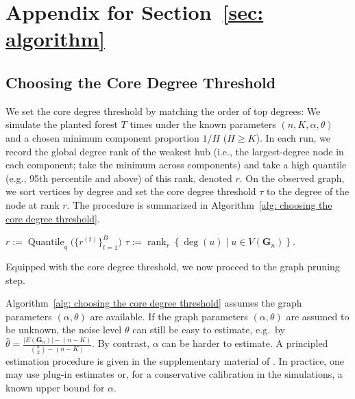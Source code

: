 \documentclass[twoside,11pt]{article}
\theoremstyle{remark}
\begin{document}
\newpage
\section{Appendix for Section~\ref{sec: algorithm}}

\subsection{Choosing the Core Degree Threshold}
\label{secsec: Choosing the Core Degree Threshold}
We set the core degree threshold by matching the order of top degrees: 
We simulate the planted forest $T$ times under the known parameters $(n, K,\alpha,\theta)$ and a chosen minimum component proportion $1/H$ ($H\ge K$).
In each run, we record the global degree rank of the weakest hub (i.e., the largest-degree node in each component; take the minimum across components) and take a high quantile (e.g., 95th percentile and above) of this rank, denoted $r$. 
On the observed graph, we sort vertices by degree and set the core degree threshold $\tau$ to the degree of the node at rank $r$.
The procedure is summarized in Algorithm~\ref{alg: choosing the core degree threshold}.

\begin{algorithm}[tbp]

\caption{Rank-based selection of core degree threshold $\tau$}
\label{alg: choosing the core degree threshold}
$r:= \operatorname{Quantile}_{q}\big(\{r^{(t)}\}_{t=1}^{B}\big)$\;
\Return $\tau:=\operatorname{rank}_{r}\left\{\operatorname{deg}\left(u\right)\mid u \in V\left(\bm{G}_n\right)\right\}$.

\end{algorithm}

Equipped with the core degree threshold, we now proceed to the graph pruning step.

\begin{remark}
Algorithm~\ref{alg: choosing the core degree threshold} assumes the graph parameters $(\alpha,\theta)$ are available.
If the graph parameters $(\alpha, \theta)$ are assumed to be unknown,
the noise level $\theta$ can still be easy to estimate, e.g.\ by 
$\hat{\theta}=\frac{|E(\boldsymbol{G}_n)|-(n-K)}{\binom{n}{2}-(n-K)}$.
By contrast, $\alpha$ can be harder to estimate.
A principled estimation procedure is given in the supplementary material of \cite{crane2024root}. 
In practice, one may use plug-in estimates or, for a conservative calibration in the simulations, a known upper bound for $\alpha$.
\end{remark}
\end{document}
